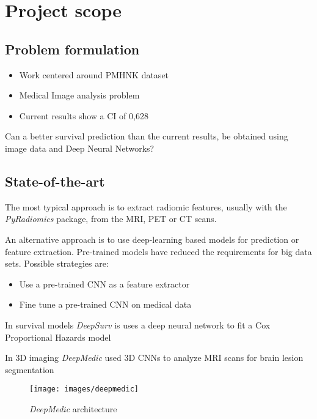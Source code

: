 
\section{Project scope}
\subsection{Problem formulation}
\begin{frame}{\insertsubsec}

  \begin{itemize}
    \item Work centered around PMHNK dataset
    \item Medical Image analysis problem
    \item Current results show a CI of 0,628
  \end{itemize}
  
  Can a better survival prediction than the current results, be obtained using image
  data and Deep Neural Networks?
\end{frame}

\subsection{State-of-the-art}
\begin{frame}{\insertsubsec}
  The most typical approach is to extract radiomic features, usually with
  the \emph{PyRadiomics} package, from the MRI, PET or CT scans.

  \vspace{.5cm}
  An alternative approach is to use deep-learning based models for prediction or 
  feature extraction. Pre-trained models have reduced the requirements for big data sets.
  Possible strategies are:
  \begin{itemize}
    \item Use a pre-trained CNN as a feature extractor
    \item Fine tune a pre-trained CNN on medical data
  \end{itemize}
  \vspace{.5cm}
  In survival models \emph{DeepSurv} is uses a deep neural network to fit a Cox Proportional 
  Hazards model
\end{frame}

\begin{frame}
  In 3D imaging \emph{DeepMedic} used 3D CNNs to analyze MRI scans for brain lesion segmentation

  \vspace{.5cm}
  \begin{figure}
    \centering
    \texttt{[image: images/deepmedic]}
    \caption{\emph{DeepMedic} architecture}
  \end{figure}
\end{frame}

